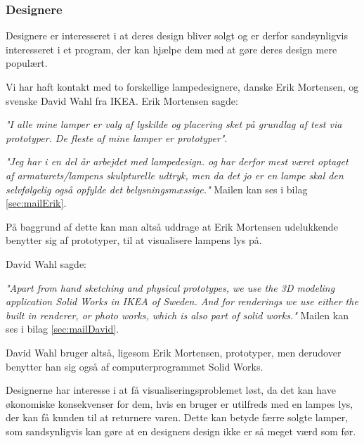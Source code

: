 \subsubsection{Designere}
Designere er interesseret i at deres design bliver solgt og er derfor sandsynligvis interesseret i et program, der kan hjælpe dem med at gøre deres design mere populært.

 
Vi har haft kontakt med to forskellige lampedesignere, danske Erik Mortensen, og svenske David Wahl fra IKEA. Erik Mortensen sagde: 
\begin{center}
\textit{"I alle mine lamper er valg af lyskilde og placering sket på grundlag af test via prototyper. De fleste af mine lamper er prototyper"}.

\textit{"Jeg har i en del år arbejdet med lampedesign. og har derfor mest været optaget af armaturets/lampens skulpturelle udtryk, men da det jo er en lampe skal den selvfølgelig  også opfylde det belysningsmæssige."} Mailen kan ses i bilag \ref{sec:mailErik}.
\end{center}

På baggrund af dette kan man altså uddrage at Erik Mortensen udelukkende benytter sig af prototyper, til at visualisere lampens lys på.

David Wahl sagde:
\begin{center}
\textit{"Apart from hand sketching and physical prototypes, we use the 3D modeling application Solid Works in IKEA of Sweden. And for renderings we use either the built in renderer, or photo works, which is also part of solid works."} Mailen kan ses i bilag \ref{sec:mailDavid}.
\end{center}

David Wahl bruger altså, ligesom Erik Mortensen, prototyper, men derudover benytter han sig også af computerprogrammet Solid Works.

Designerne har interesse i at få visualiseringsproblemet løst, da det kan have økonomiske konsekvenser for dem, hvis en bruger er utilfreds med en lampes lys, der kan få kunden til at returnere varen. Dette kan betyde færre solgte lamper, som sandsynligvis kan gøre at en designers design ikke er så meget værd som før.